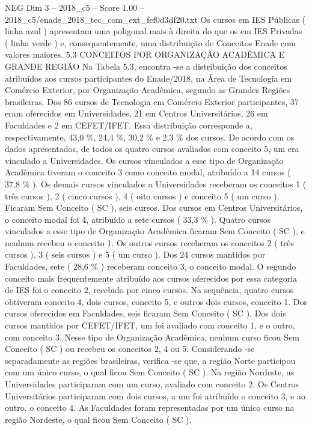 \begin{textsample}{NEG Dim 3 – 2018\_c5 – Score 1.00 – 2018\_c5/enade\_2018\_tec\_com\_ext\_fef0d3df20.txt}
Os cursos em IES Públicas ( linha azul ) apresentam uma poligonal mais à direita do que os em IES Privadas ( linha verde ) e, consequentemente, uma distribuição de Conceitos Enade com valores maiores. 5.3 CONCEITOS POR ORGANIZAÇÃO ACADÊMICA E GRANDE REGIÃO Na Tabela 5.3, encontra -se a distribuição dos conceitos atribuídos aos cursos participantes do Enade/2018, na Área de Tecnologia em Comércio Exterior, por Organização Acadêmica, segundo as Grandes Regiões brasileiras.
Dos 86 cursos de Tecnologia em Comércio Exterior participantes, 37 eram oferecidos em Universidades, 21 em Centros Universitários, 26 em Faculdades e 2 em CEFET/IFET.
Essa distribuição corresponde a, respectivamente, 43,0 \%, 24,4 \%, 30,2 \% e 2,3 \% dos cursos.
De acordo com os dados apresentados, de todos os quatro cursos avaliados com conceito 5, um era vinculado a Universidades.
Os cursos vinculados a esse tipo de Organização Acadêmica tiveram o conceito 3 como conceito modal, atribuído a 14 cursos ( 37,8 \% ).
Os demais cursos vinculados a Universidades receberam os conceitos 1 ( três cursos ), 2 ( cinco cursos ), 4 ( oito cursos ) e conceito 5 ( um curso ).
Ficaram Sem Conceito ( SC ), seis cursos.
Dos cursos em Centros Universitários, o conceito modal foi 4, atribuído a sete cursos ( 33,3 \% ).
Quatro cursos vinculados a esse tipo de Organização Acadêmica ficaram Sem Conceito ( SC ), e nenhum recebeu o conceito 1.
Os outros cursos receberam os conceitos 2 ( três cursos ), 3 ( seis cursos ) e 5 ( um curso ).
Dos 24 cursos mantidos por Faculdades, sete ( 28,6 \% ) receberam conceito 3, o conceito modal.
O segundo conceito mais frequentemente atribuído aos cursos oferecidos por essa categoria de IES foi o conceito 2, recebido por cinco cursos.
Na sequência, quatro cursos obtiveram conceito 4, dois cursos, conceito 5, e outros dois cursos, conceito 1.
Dos cursos oferecidos em Faculdades, seis ficaram Sem Conceito ( SC ).
Dos dois cursos mantidos por CEFET/IFET, um foi avaliado com conceito 1, e o outro, com conceito 3.
Nesse tipo de Organização Acadêmica, nenhum curso ficou Sem Conceito ( SC ) ou recebeu os conceitos 2, 4 ou 5.
Considerando -se separadamente as regiões brasileiras, verifica -se que, a região Norte participou com um único curso, o qual ficou Sem Conceito ( SC ).
Na região Nordeste, as Universidades participaram com um curso, avaliado com conceito 2.
Os Centros Universitários participaram com dois cursos, a um foi atribuído o conceito 3, e ao outro, o conceito 4.
As Faculdades foram representadas por um único curso na região Nordeste, o qual ficou Sem Conceito ( SC ).

\end{textsample}
